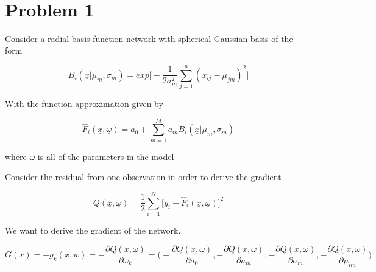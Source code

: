 \documentclass[11pt]{article}
\begin{document}
\begin{center}

\ \\
\end{center}

\section*{Problem 1}

\vspace{5 mm}
\noindent
 Consider a radial basis function network with spherical Gaussian basis of the form
 
 $$B_i(\underline{x}|\mu_m, \sigma_m) = exp\bigg[-\frac{1}{2\sigma_m^2}\sum_{j = 1}^{n}(x_{ij}-\mu_{jm})^2\bigg]$$
 
 With the function approximation given by 
 
 $$\hat{F}_i(\underline{x},\underline{\omega}) = a_0 + \sum_{m=1}^{M}a_mB_i(\underline{x}|\mu_m, \sigma_m)$$
 
 \begin{center}
 where $\underline{\omega}$ is all of the parameters in the model
 \end{center}
 
 Consider the residual from one observation in order to derive the gradient
 
 $$Q(\underline{x},\underline{\omega}) = \frac{1}{2} \sum_{i=1}^N \bigg[ y_i - \hat{F}_i(\underline{x},\underline{\omega})\bigg]^2$$
 
 We want to derive the gradient of the network. 
 
 \begin{equation}
 G(x) = -g_k(\underline{x}, \underline{w}) = - \frac{\partial Q(\underline{x}, \underline{\omega})}{\partial\omega_k} = \bigg(-\frac{ \partial Q(\underline{x}, \underline{\omega})} {\partial a_0}, - \frac{\partial Q(\underline{x}, \underline{\omega})}{\partial a_m}, - \frac{\partial Q(\underline{x}, \underline{\omega})}{\partial \sigma_m}, - \frac{\partial Q(\underline{x}, \underline{\omega})}{\partial \mu_{im}}\bigg)
 \end{equation}
 
\end{document}
